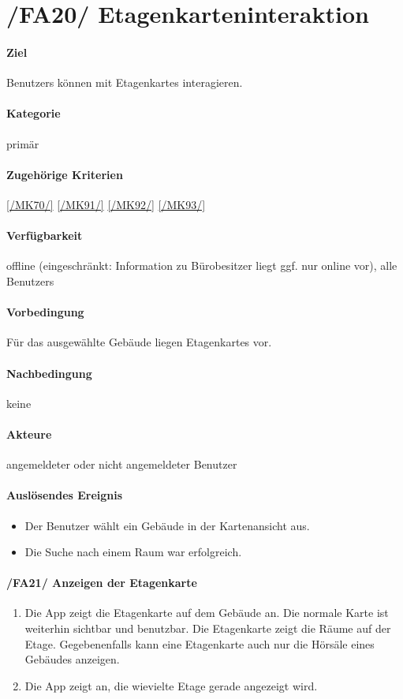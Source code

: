 \section[Etagenkarteninteraktion]{/FA20/ Etagenkarteninteraktion}
\label{/FA20/}
\paragraph{Ziel}
\Glspl{Benutzer} können mit \Glspl{Etagenkarte} interagieren.
\paragraph{Kategorie}
primär
\paragraph{Zugehörige Kriterien}
\ref{/MK70/} \ref{/MK91/} \ref{/MK92/} \ref{/MK93/} 
\paragraph{Verfügbarkeit}
\gls{offline} (eingeschränkt: Information zu Bürobesitzer liegt ggf. nur online vor), alle \Glspl{Benutzer}
\paragraph{Vorbedingung}
Für das ausgewählte Gebäude liegen \Glspl{Etagenkarte} vor.
\paragraph{Nachbedingung}
keine
\paragraph{Akteure}
angemeldeter oder nicht angemeldeter \Gls{Benutzer}
\paragraph{Auslösendes Ereignis}
\begin{itemize}
    \item Der \Gls{Benutzer} wählt ein Gebäude in der \Gls{Kartenansicht} aus.
    \item Die Suche nach einem Raum war erfolgreich.
\end{itemize}
 
\paragraph{/FA21/ Anzeigen der Etagenkarte}
\label{/FA21/}
\begin{enumerate}
    \item Die App zeigt die \Gls{Etagenkarte} auf dem Gebäude an. Die normale \Gls{Karte} ist weiterhin sichtbar und benutzbar. Die \Gls{Etagenkarte} zeigt die Räume auf der Etage. Gegebenenfalls kann eine \Gls{Etagenkarte} auch nur die Hörsäle eines Gebäudes anzeigen.
    \item Die App zeigt an, die wievielte Etage gerade angezeigt wird.
\end{enumerate}
